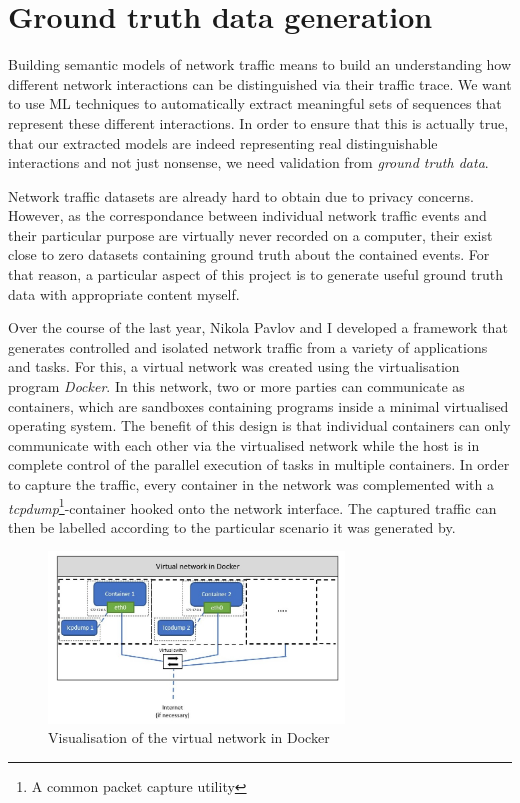 \documentclass[a4paper,12pt,twoside]{report}
\begin{document}
\section{Ground truth data generation}\label{Groundtruth}

Building semantic models of network traffic means to build an understanding how different network interactions can be distinguished via their traffic trace. We want to use ML techniques to automatically extract meaningful sets of sequences that represent these different interactions. In order to ensure that this is actually true, that our extracted models are indeed representing real distinguishable interactions and not just nonsense, we need validation from \textit{ground truth data}. 

Network traffic datasets are already hard to obtain due to privacy concerns. However, as  the correspondance between individual network traffic events and their particular purpose are virtually never recorded on a computer, their exist close to zero datasets containing ground truth about the contained events. For that reason, a particular aspect of this project is to generate useful ground truth data with appropriate content myself.

Over the course of the last year, Nikola Pavlov and I developed a framework that generates controlled and isolated network traffic from a variety of applications and tasks. For this, a virtual network was created using the virtualisation program \textit{Docker}. In this network, two or more parties can communicate as containers,  which are sandboxes containing programs inside a minimal virtualised operating system. The benefit of this design is that individual containers can only communicate with each other via the virtualised network while the host is in complete control of the parallel execution of tasks in multiple containers. In order to capture the traffic, every container in the network was complemented with a \textit{tcpdump}\footnote{A common packet capture utility}-container hooked onto the network interface. The captured traffic can then be labelled according to the particular scenario it was generated by.


\begin{figure}
\centering
\includegraphics[width=0.7\textwidth]{images/Dockernet.jpg}
\caption{Visualisation of the virtual network in Docker}\label{docker}
\end{figure}
\end{document}
